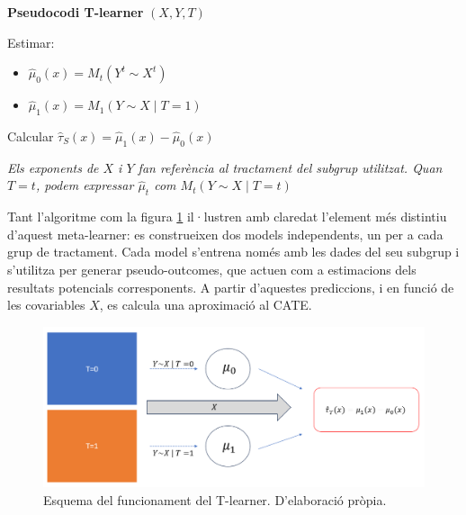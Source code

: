 \documentclass[../main.tex]{subfiles}
\begin{document}
    \begin{table}[H]
        \begin{minipage}{\linewidth}
            \begin{algorithm}[H]
            \caption{\textbf{Pseudocodi T-learner} $(X,Y,T)$}
            \begin{algorithmic}[1]
              \State Estimar: 
                    \begin{itemize}
                        \item[] $\hat{\mu}_0(x) = M_t(Y^t \sim X^t)$
                        \item[] $\hat{\mu}_1(x) = M_1(Y \sim X \mid T = 1)$
                      \end{itemize}
              \State Calcular $\hat{\tau}_S(x) = \hat{\mu}_1(x) - \hat{\mu}_0(x)$
            \end{algorithmic}
            \end{algorithm}
            \vspace{-3ex}
            {\scriptsize\textit{Els exponents de $X$ i $Y$ fan referència al tractament del subgrup utilitzat. Quan $T=t$, podem expressar $\hat{\mu}_t$ com $ M_t(Y \sim X \mid T = t)$}}
        \end{minipage}
    \end{table}

    Tant l’algoritme com la figura \ref{fig:tl} il·lustren amb claredat l’element més distintiu d’aquest meta-learner: es construeixen dos models independents, un per a cada grup de tractament. Cada model s’entrena només amb les dades del seu subgrup i s’utilitza per generar pseudo-outcomes, que actuen com a estimacions dels resultats potencials corresponents. A partir d’aquestes prediccions, i en funció de les covariables $X$, es calcula una aproximació al CATE.
    
    \begin{figure}[H]
        \centering
        \includegraphics[width=0.8\linewidth]{imgs/t-learner.png}
        \caption{Esquema del funcionament del T-learner. D'elaboració pròpia.}
        \label{fig:tl}
    \end{figure}
\end{document}
